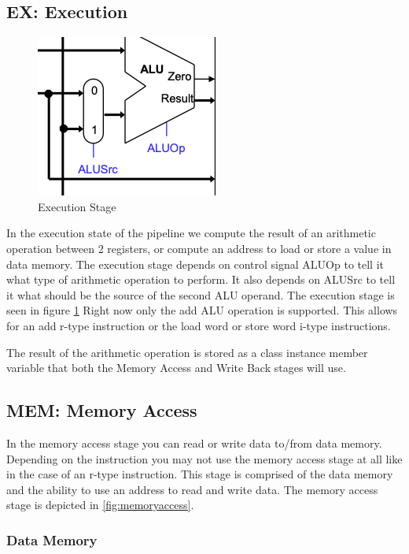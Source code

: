 \documentclass[conference]{IEEEtran}
\begin{document}
\subsection{EX: Execution}

\begin{figure}
    \centering
    \includegraphics[scale=.4]{execution.png}
    \caption{Execution Stage}
    \label{fig:execution}
\end{figure}

In the execution state of the pipeline we compute the result of an arithmetic operation between 2 registers, or compute an address to load or store a value in data memory.  The execution stage depends on control signal ALUOp to tell it what type of arithmetic operation to perform.  It also depends on ALUSrc to tell it what should be the source of the second ALU operand.  The execution stage is seen in figure \ref{fig:execution}  Right now only the add ALU operation is supported.  This allows for an add r-type instruction or the load word or store word i-type instructions.

The result of the arithmetic operation is stored as a class instance member variable that both the Memory Access and Write Back stages will use.

\subsection{MEM: Memory Access}

In the memory access stage you can read or write data to/from data memory.  Depending on the instruction you may not use the memory access stage at all like in the case of an r-type instruction.  This stage is comprised of the data memory and the ability to use an address to read and write data.  The memory access stage is depicted in \ref{fig:memoryaccess}.

\subsubsection{Data Memory}
\end{document}

